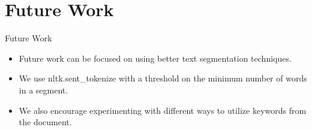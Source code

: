 \section{Future Work}

	\begin{frame}{Future Work}

		\begin{itemize}
			\item Future work can be focused on using better text segmentation techniques.
			\item We use nltk.sent\_tokenize with a threshold on the minimum number of words
			in a segment.
			\item We also encourage experimenting with different ways to utilize keywords from
			the document.
		\end{itemize}

	\end{frame}
